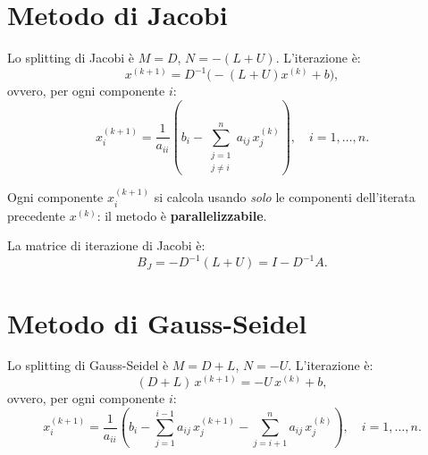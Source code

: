 \section{Metodo di Jacobi}
\label{sec:jacobi}

\begin{definition}
Lo splitting di Jacobi è $M = D$, $N = -(L + U)$. L'iterazione è:
\begin{equation}
  x^{(k+1)} = D^{-1}\bigl(-(L+U)x^{(k)} + b\bigr),
  \label{eq:jacobi_mat}
\end{equation}
ovvero, per ogni componente $i$:
\begin{equation}
  x_i^{(k+1)} = \frac{1}{a_{ii}}\left(b_i - \sum_{\substack{j=1 \\ j \neq i}}^n
  a_{ij}\, x_j^{(k)}\right), \quad i = 1, \ldots, n.
  \label{eq:jacobi_comp}
\end{equation}
\end{definition}

\begin{remark}
Ogni componente $x_i^{(k+1)}$ si calcola usando \emph{solo} le componenti
dell'iterata precedente $x^{(k)}$: il metodo è \textbf{parallelizzabile}.
\end{remark}

La matrice di iterazione di Jacobi è:
\begin{equation}
  B_J = -D^{-1}(L + U) = I - D^{-1}A.
  \label{eq:B_jacobi}
\end{equation}

\section{Metodo di Gauss-Seidel}
\label{sec:gauss_seidel}

\begin{definition}
Lo splitting di Gauss-Seidel è $M = D + L$, $N = -U$. L'iterazione è:
\begin{equation}
  (D + L)\,x^{(k+1)} = -U\,x^{(k)} + b,
  \label{eq:gs_mat}
\end{equation}
ovvero, per ogni componente $i$:
\begin{equation}
  x_i^{(k+1)} = \frac{1}{a_{ii}}\left(b_i
  - \sum_{j=1}^{i-1} a_{ij}\, x_j^{(k+1)}
  - \sum_{j=i+1}^{n} a_{ij}\, x_j^{(k)}\right), \quad i = 1, \ldots, n.
  \label{eq:gs_comp}
\end{equation}
\end{definition}

